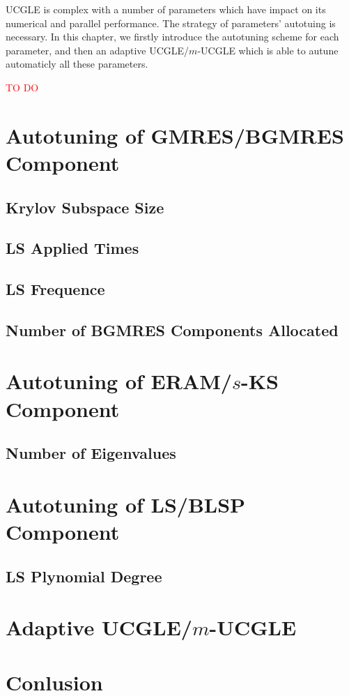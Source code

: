 \begin{displayquote}
	\textsf{UCGLE is complex with a number of parameters which have impact on its numerical and parallel performance. The strategy of parameters' autotuing is necessary. In this chapter, we firstly introduce the autotuning scheme for each parameter, and then an adaptive UCGLE/$m$-UCGLE which is able to autune automaticly all these parameters.}
\end{displayquote}

\vspace{0.6in}

\textcolor{red}{TO DO}

\section{Autotuning of GMRES/BGMRES Component}
\subsection{Krylov Subspace Size}
\subsection{LS Applied Times}
\subsection{LS Frequence}
\subsection{Number of BGMRES Components Allocated}
\section{Autotuning of ERAM/$s$-KS Component}
\subsection{Number of Eigenvalues}
\section{Autotuning of LS/BLSP Component}
\subsection{LS Plynomial Degree}
\section{Adaptive UCGLE/$m$-UCGLE}
\section{Conlusion}

\clearemptydoublepage